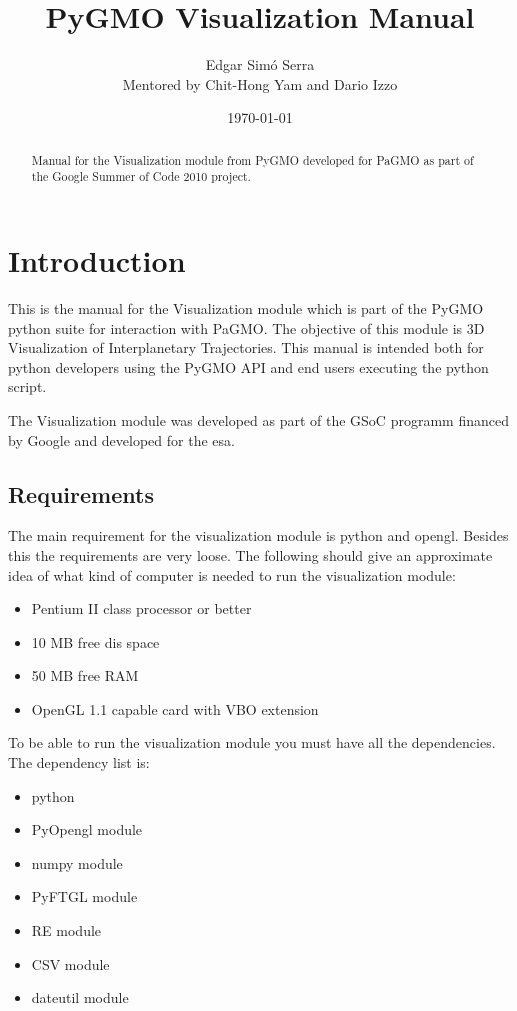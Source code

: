 \documentclass[a4paper,11pt]{article}
\title{PyGMO Visualization Manual}
\author{
      Edgar Sim\'{o} Serra \\
      Mentored by Chit-Hong Yam and Dario Izzo 
}
\date{\today}
\begin{document}


\begin{abstract}
Manual for the Visualization module from PyGMO developed for PaGMO as part of the Google Summer of Code 2010 project.
\end{abstract}


\tableofcontents
\newpage


\section{Introduction}

This is the manual for the Visualization module which is part of the \gls{PyGMO} python suite for interaction with \gls{PaGMO}\cite{pagmo}. The objective of this module is 3D Visualization of Interplanetary Trajectories. This manual is intended both for python developers using the PyGMO \gls{API} and end users executing the python script.

The Visualization module was developed as part of the \gls{GSoC} programm financed by Google and developed for the \gls{esa}.


\subsection{Requirements}

The main requirement for the visualization module is \gls{python} and \gls{opengl}. Besides this the requirements are very loose. The following should give an approximate idea of what kind of computer is needed to run the visualization module:

\begin{itemize}
\item Pentium II class processor or better
\item 10 MB free dis space
\item 50 MB free RAM
\item OpenGL 1.1 capable card with VBO extension
\end{itemize}

To be able to run the visualization module you must have all the dependencies. The dependency list is:\label{lbl:deps}

\begin{itemize}
\item \gls{python}
\item PyOpengl module
\item numpy module
\item PyFTGL module
\item RE module
\item CSV module
\item dateutil module
\end{itemize}
\end{document}
